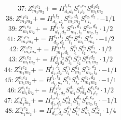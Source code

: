 \documentclass[letterpaper,10pt,fleqn,leqno,onecolumn]{article}
\begin{document}
\begin{equation} \;\;\;\;\;\;  37: Z^{e_{1}e_{2}}_{m_{1}m_{2}}+=H^{l_{1}l_{2}}_{d_{1}d_{2}}S^{e_{1}e_{2}}_{l_{1}l_{2}}S^{d_{1}d_{2}}_{m_{1}m_{2}} \end{equation}
\begin{equation} \;\;\;\;\;\;  38: Z^{e_{1}e_{2}}_{m_{1}m_{2}}+=H^{l_{1}l_{2}}_{d_{1},d_{2}}S^{e_{1},d_{1}}_{m_{1}m_{2}}S^{e_{2},d_{2}}_{l_{1}l_{2}}\cdot -1/1 \end{equation}
\begin{equation} \;\;\;\;\;\;  39: Z^{e_{1}e_{2}}_{m_{1}m_{2}}+=H^{l_{1},l_{2}}_{d_{1},d_{2}}S^{e_{1},d_{1}}_{m_{1},l_{1}}S^{e_{2},d_{2}}_{m_{2},l_{2}}\cdot 1/2 \end{equation}
\begin{equation} \;\;\;\;\;\;  41: Z^{e_{1}e_{2}}_{m_{1}m_{2}}+=H^{e_{1},l_{1}}_{d_{1},d_{2}}S^{e_{2}}_{l_{1}}S^{d_{1}}_{m_{1}}S^{d_{2}}_{m_{2}}\cdot -1/2 \end{equation}
\begin{equation} \;\;\;\;\;\;  42: Z^{e_{1}e_{2}}_{m_{1}m_{2}}+=H^{l_{1},l_{2}}_{m_{1},d_{1}}S^{e_{1}}_{l_{1}}S^{e_{2}}_{l_{2}}S^{d_{1}}_{m_{2}}\cdot 1/2 \end{equation}
\begin{equation} \;\;\;\;\;\;  43: Z^{e_{1}e_{2}}_{m_{1}m_{2}}+=H^{l_{1},l_{2}}_{d_{1}d_{2}}S^{e_{1}}_{l_{1}}S^{e_{2}}_{l_{2}}S^{d_{1}d_{2}}_{m_{1}m_{2}}\cdot 1/2 \end{equation}
\begin{equation} \;\;\;\;\;\;  44: Z^{e_{1}e_{2}}_{m_{1}m_{2}}+=H^{l_{1},l_{2}}_{d_{1},d_{2}}S^{e_{1}}_{l_{1}}S^{d_{1}}_{m_{1}}S^{e_{2},d_{2}}_{m_{2},l_{2}}\cdot -1/1 \end{equation}
\begin{equation} \;\;\;\;\;\;  45: Z^{e_{1}e_{2}}_{m_{1}m_{2}}+=H^{l_{1},l_{2}}_{d_{1},d_{2}}S^{e_{1}}_{l_{1}}S^{d_{1}}_{l_{2}}S^{e_{2},d_{2}}_{m_{1}m_{2}}\cdot -1/1 \end{equation}
\begin{equation} \;\;\;\;\;\;  46: Z^{e_{1}e_{2}}_{m_{1}m_{2}}+=H^{l_{1}l_{2}}_{d_{1},d_{2}}S^{d_{1}}_{m_{1}}S^{d_{2}}_{m_{2}}S^{e_{1}e_{2}}_{l_{1}l_{2}}\cdot 1/2 \end{equation}
\begin{equation} \;\;\;\;\;\;  47: Z^{e_{1}e_{2}}_{m_{1}m_{2}}+=H^{l_{1},l_{2}}_{d_{1},d_{2}}S^{d_{1}}_{m_{1}}S^{d_{2}}_{l_{1}}S^{e_{1}e_{2}}_{m_{2},l_{2}}\cdot -1/1 \end{equation}
\begin{equation} \;\;\;\;\;\;  48: Z^{e_{1}e_{2}}_{m_{1}m_{2}}+=H^{l_{1},l_{2}}_{d_{1},d_{2}}S^{e_{1}}_{l_{1}}S^{e_{2}}_{l_{2}}S^{d_{1}}_{m_{1}}S^{d_{2}}_{m_{2}}\cdot 1/4 \end{equation}
\end{document}
